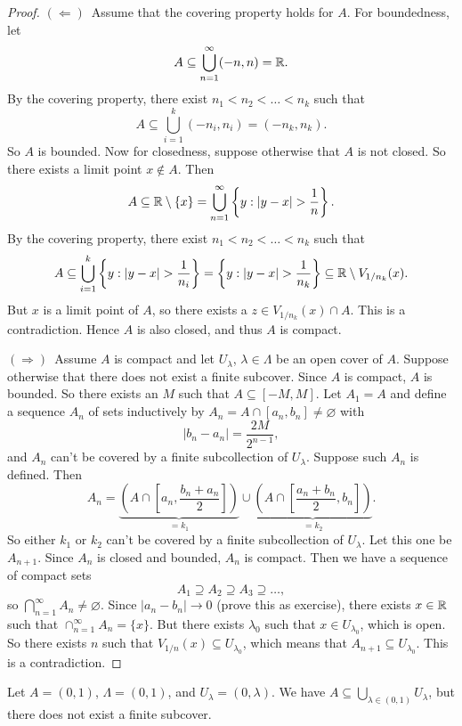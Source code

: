 \begin{proof}
  $(\Leftarrow)$\, Assume that the covering property holds for
  $A$. For boundedness, let
  \[A \subseteq \bigcup_{n = 1}^\infty (-n, n) = \mathbb{R}.\]
  By the covering property, there exist
  $n_1 < n_2 < \dots < n_k$ such that
  \[A \subseteq \bigcup_{i = 1}^k (-n_i, n_i) = (-n_k, n_k).\]
  So $A$ is bounded. Now for closedness, suppose otherwise
  that $A$ is not closed. So there exists a limit point
  $x \notin A$. Then
  \[A \subseteq \mathbb{R} \setminus \{x\} = \bigcup_{n = 1}^\infty \left\{y : |y - x| > \frac{1}{n}\right\}.\]
  By the covering property, there exist
  $n_1 < n_2 < \dots < n_k$ such that
  \[A \subseteq \bigcup_{i = 1}^k \left\{y : |y - x| > \frac{1}{n_i}\right\} = \left\{y : |y - x| > \frac{1}{n_k}\right\} \subseteq \mathbb{R} \setminus V_{1 / n_k}(x).\]
  But $x$ is a limit point of $A$, so there exists a
  $z \in V_{1 / n_k}(x) \cap A$. This is a contradiction.
  Hence $A$ is also closed, and thus $A$ is compact.

  $(\Rightarrow)$\, Assume $A$ is compact and let
  $U_\lambda$, $\lambda \in \Lambda$ be an open cover
  of $A$. Suppose otherwise that there does not
  exist a finite subcover.
  Since $A$ is compact, $A$ is bounded. So there exists
  an $M$ such that $A \subseteq [-M, M]$. Let $A_1 = A$
  and define a sequence $A_n$ of sets inductively by
  $A_n = A \cap [a_n, b_n] \ne \varnothing$ with
  \[
    |b_n - a_n| = \frac{2M}{2^{n - 1}}
  ,\]
  and $A_n$ can't be covered by a finite subcollection
  of $U_\lambda$. Suppose such $A_n$ is defined.
  Then
  \[A_n = \underbrace{\left(A \cap \left[a_n, \frac{b_n + a_n}{2}\right]\right)}_{= k_1} \cup \underbrace{\left(A \cap \left[\frac{a_n + b_n}{2}, b_n\right]\right)}_{= k_2}.\]
  So either $k_1$ or $k_2$ can't be covered by a finite
  subcollection of $U_\lambda$. Let this one be $A_{n + 1}$.
  Since $A_n$ is closed and bounded, $A_n$ is compact.
  Then we have a sequence of compact sets
  \[A_1 \supseteq A_2 \supseteq A_3 \supseteq \dots,\]
  so $\bigcap_{n = 1}^\infty A_n \ne \varnothing$.
  Since $|a_n - b_n| \to 0$ (prove this as exercise),
  there exists $x \in \mathbb{R}$ such that
  $\cap_{n = 1}^\infty A_n = \{x\}$. But there exists
  $\lambda_0$ such that $x \in U_{\lambda_0}$, which is open.
  So there exists $n$ such that
  $V_{1 / n}(x) \subseteq U_{\lambda_0}$, which means that
  $A_{n + 1} \subseteq U_{\lambda_0}$. This is a
  contradiction.
\end{proof}

\begin{example}
  Let $A = (0, 1)$, $\Lambda = (0, 1)$, and
  $U_\lambda = (0, \lambda)$. We have
  $A \subseteq \bigcup_{\lambda \in (0, 1)} U_\lambda$,
  but there does not exist a finite subcover.
\end{example}
